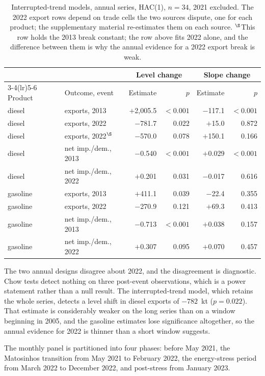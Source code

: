 \documentclass[11pt,a4paper]{article}
\begin{document}
\begin{table}[htbp]
\centering
\caption{Interrupted-trend models, annual series, HAC(1), $n=34$, 2021 excluded. The 2022 export
rows depend on trade cells the two sources dispute, one for each product; the
supplementary material re-estimates them on each source. $^{\S}$This row holds the 2013 break constant; the row above fits 2022 alone, and the difference between them is why the annual evidence for a 2022 export break is weak.}
\label{tab:its}
\begin{tabular}{llrrrr}
\toprule
& & \multicolumn{2}{c}{Level change} & \multicolumn{2}{c}{Slope change} \\
\cmidrule(lr){3-4}\cmidrule(lr){5-6}
Product & Outcome, event & Estimate & $p$ & Estimate & $p$ \\
\midrule
diesel & exports, 2013 & $+$2{,}005.5 & $<0.001$ & $-$117.1 & $<0.001$ \\
diesel & exports, 2022 & $-$781.7 & 0.022 & $+$15.0 & 0.872 \\
diesel & exports, 2022$^{\S}$ & $-$570.0 & 0.078 & $+$150.1 & 0.166 \\
diesel & net imp./dem., 2013 & $-$0.540 & $<0.001$ & $+$0.029 & $<0.001$ \\
diesel & net imp./dem., 2022 & $+$0.201 & 0.031 & $-$0.017 & 0.616 \\
gasoline & exports, 2013 & $+$411.1 & 0.039 & $-$22.4 & 0.355 \\
gasoline & exports, 2022 & $-$270.9 & 0.121 & $+$69.3 & 0.413 \\
gasoline & net imp./dem., 2013 & $-$0.713 & $<0.001$ & $+$0.038 & 0.157 \\
gasoline & net imp./dem., 2022 & $+$0.307 & 0.095 & $+$0.070 & 0.457 \\
\bottomrule
\end{tabular}
\end{table}

The two annual designs disagree about 2022, and the disagreement is diagnostic. Chow tests
detect nothing on three post-event observations, which is a power statement rather than a null
result. The interrupted-trend model, which retains the whole series, detects a level shift in
diesel exports of $-782$~kt ($p=0.022$). That estimate is considerably weaker on the long series
than on a window beginning in 2005, and the gasoline estimates lose significance altogether, so
the annual evidence for 2022 is thinner than a short window suggests.

The monthly panel is partitioned into four phases: before May 2021, the Matosinhos transition
from May 2021 to February 2022, the energy-stress period from March 2022 to December 2022, and
post-stress from January 2023.
\end{document}
